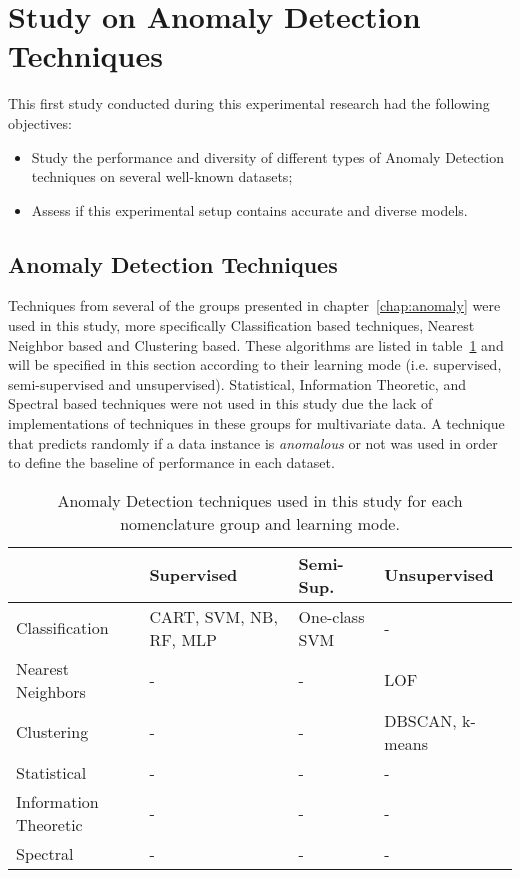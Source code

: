 \section{Study on Anomaly Detection Techniques}

This first study conducted during this experimental research had the following objectives:

\begin{itemize}
	\item Study the performance and diversity of different types of Anomaly Detection techniques on several well-known datasets;
	
	\item Assess if this experimental setup contains accurate and diverse models.
\end{itemize}

\subsection{Anomaly Detection Techniques}\label{sec:study_techniques}

Techniques from several of the groups presented in chapter~\ref{chap:anomaly} were used in this study, more specifically Classification based techniques, Nearest Neighbor based and Clustering based. These algorithms are listed in table~\ref{tab:nanomaly} and will be specified in this section according to their learning mode (i.e. supervised, semi-supervised and unsupervised).
Statistical, Information Theoretic, and Spectral based techniques were not used in this study due the lack of implementations of techniques in these groups for multivariate data.
A technique that predicts randomly if a data instance is \textit{anomalous} or not was used in order to define the baseline of performance in each dataset. 

\begin{table}[!ht]
	\centering
	\caption{Anomaly Detection techniques used in this study for each nomenclature group and learning mode.}
	\label{tab:nanomaly}
	\begin{tabular}{@{}lp{3cm}p{3cm}p{2.5cm}@{}}
		\toprule
		& \textbf{Supervised} & \textbf{Semi-Sup.} & \textbf{Unsupervised} \\ \midrule
		Classification & CART, SVM, NB, RF, MLP & One-class SVM & - \\
		Nearest Neighbors & - & - & LOF \\
		Clustering & - & - & DBSCAN, \newline k-means \\
		Statistical & - & - & - \\
		Information Theoretic & - & - & - \\
		Spectral & - & - & - \\ \bottomrule
	\end{tabular}
\end{table}


